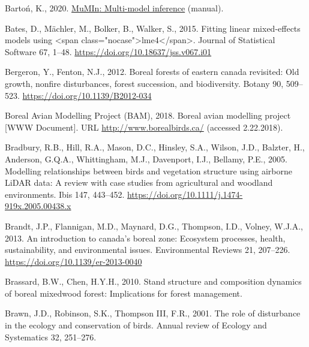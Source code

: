 \documentclass[
  12pt,
]{article}
\newlength{\cslhangindent}
\newlength{\cslentryspacingunit} %
\newenvironment{CSLReferences}[2] %
 {%
  \setlength{\parindent}{0pt}
  \ifodd #1
  \let\oldpar\par
  \def\par{\hangindent=\cslhangindent\oldpar}
  \fi
  \setlength{\parskip}{#2\cslentryspacingunit}
 }%
 {}
\begin{document}
\begin{CSLReferences}{1}{0}
\leavevmode{}%
Bartoń, K., 2020. \href{https://CRAN.R-project.org/package=MuMIn}{{MuMIn}: Multi-model inference} (manual).

\leavevmode{}%
Bates, D., Mächler, M., Bolker, B., Walker, S., 2015. Fitting linear mixed-effects models using {\textless{}}span class="nocase"{\textgreater{}}lme4{\textless{}}/span{\textgreater{}}. Journal of Statistical Software 67, 1--48. \url{https://doi.org/10.18637/jss.v067.i01}

\leavevmode{}%
Bergeron, Y., Fenton, N.J., 2012. Boreal forests of eastern canada revisited: Old growth, nonfire disturbances, forest succession, and biodiversity. Botany 90, 509--523. \url{https://doi.org/10.1139/B2012-034}

\leavevmode{}%
Boreal Avian Modelling Project (BAM), 2018. Boreal avian modelling project {[}WWW Document{]}. URL \url{http://www.borealbirds.ca/} (accessed 2.22.2018).

\leavevmode{}%
Bradbury, R.B., Hill, R.A., Mason, D.C., Hinsley, S.A., Wilson, J.D., Balzter, H., Anderson, G.Q.A., Whittingham, M.J., Davenport, I.J., Bellamy, P.E., 2005. Modelling relationships between birds and vegetation structure using airborne {LiDAR} data: A review with case studies from agricultural and woodland environments. Ibis 147, 443--452. \url{https://doi.org/10.1111/j.1474-919x.2005.00438.x}

\leavevmode{}%
Brandt, J.P., Flannigan, M.D., Maynard, D.G., Thompson, I.D., Volney, W.J.A., 2013. An introduction to canada's boreal zone: Ecosystem processes, health, sustainability, and environmental issues. Environmental Reviews 21, 207--226. \url{https://doi.org/10.1139/er-2013-0040}

\leavevmode{}%
Brassard, B.W., Chen, H.Y.H., 2010. Stand structure and composition dynamics of boreal mixedwood forest: Implications for forest management.

\leavevmode{}%
Brawn, J.D., Robinson, S.K., Thompson III, F.R., 2001. The role of disturbance in the ecology and conservation of birds. Annual review of Ecology and Systematics 32, 251--276.


\end{CSLReferences}
\end{document}

